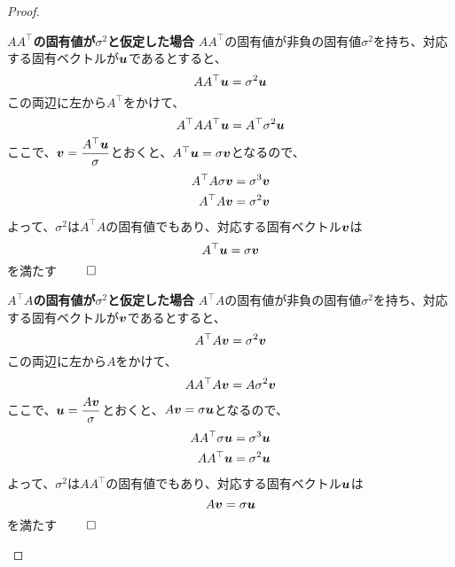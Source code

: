 \documentclass[../../../topic_linear-algebra]{subfiles}
\begin{document}
\begin{proof}
  \begin{subpattern}{\bfseries $AA^\top$の固有値が$\sigma^2$と仮定した場合}
    $AA^\top$の固有値が非負の固有値$\sigma^2$を持ち、対応する固有ベクトルが$\vb*{u}$であるとすると、
    \begin{equation*}
      AA^\top \vb*{u} = \sigma^2 \vb*{u}
    \end{equation*}
    この両辺に左から$A^\top$をかけて、
    \begin{equation*}
      A^\top AA^\top \vb*{u} = A^\top \sigma^2 \vb*{u}
    \end{equation*}
    ここで、$\vb*{v} = \dfrac{A^\top\vb*{u}}{\sigma}$とおくと、$A^\top \vb*{u} = \sigma \vb*{v}$となるので、
    \begin{align*}
      A^\top A\sigma\vb*{v} & = \sigma^3 \vb*{v} \\
      A^\top A \vb*{v}      & = \sigma^2 \vb*{v}
    \end{align*}
    よって、$\sigma^2$は$A^\top A$の固有値でもあり、対応する固有ベクトル$\vb*{v}$は
    \begin{equation*}
      A^\top \vb*{u} = \sigma \vb*{v}
    \end{equation*}
    を満たす $\qed$
  \end{subpattern}

  \begin{subpattern}{\bfseries $A^\top A$の固有値が$\sigma^2$と仮定した場合}
    $A^\top A$の固有値が非負の固有値$\sigma^2$を持ち、対応する固有ベクトルが$\vb*{v}$であるとすると、
    \begin{equation*}
      A^\top A \vb*{v} = \sigma^2 \vb*{v}
    \end{equation*}
    この両辺に左から$A$をかけて、
    \begin{equation*}
      AA^\top A \vb*{v} = A\sigma^2 \vb*{v}
    \end{equation*}
    ここで、$\vb*{u} = \dfrac{A\vb*{v}}{\sigma}$とおくと、$A\vb*{v} = \sigma \vb*{u}$となるので、
    \begin{align*}
      AA^\top\sigma\vb*{u} & = \sigma^3 \vb*{u} \\
      AA^\top \vb*{u}      & = \sigma^2 \vb*{u}
    \end{align*}
    よって、$\sigma^2$は$AA^\top$の固有値でもあり、対応する固有ベクトル$\vb*{u}$は
    \begin{equation*}
      A\vb*{v} = \sigma \vb*{u}
    \end{equation*}
    を満たす $\qed$
  \end{subpattern}
\end{proof}
\end{document}
